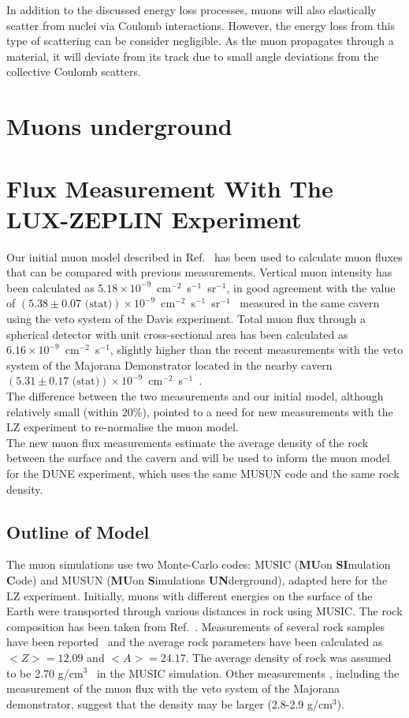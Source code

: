 In addition to the discussed energy loss processes, muons will also elastically scatter from nuclei via Coulomb interactions. However, the energy loss from this type of scattering can be consider negligible. As the muon propagates through a material, it will deviate from its track due to small angle deviations from the collective Coulomb scatters. 

\section{Muons underground}


\section{Flux Measurement With The LUX-ZEPLIN Experiment}
Our initial muon model described in Ref.~\cite{LZ_SIMS} has been used to calculate muon fluxes that can be compared with previous measurements. Vertical muon intensity has been calculated as $5.18\times10^{-9}$~cm$^{-2}$~s$^{-1}$~sr$^{-1}$, in good agreement with the value of $(5.38\pm0.07\text{ (stat)})\times10^{-9}$~cm$^{-2}$~s$^{-1}$~sr$^{-1}$~\cite{Cherry} measured in the same cavern using the veto system of the Davis experiment. Total muon flux through a spherical detector with unit cross-sectional area has been calculated as $6.16\times10^{-9}$~cm$^{-2}$~s$^{-1}$, slightly higher than the recent measurements with the veto system of the Majorana Demonstrator located in the nearby cavern $(5.31\pm0.17 \text{ (stat)})\times10^{-9}$~cm$^{-2}$~s$^{-1}$~\cite{majorana}.\\
The difference between the two measurements and our initial model, although relatively small (within 20\%), pointed to a need for new measurements with the LZ experiment to re-normalise the muon model.\\
The new muon flux measurements estimate the average density of the rock between the surface and the cavern and will be used to inform the muon model for the DUNE experiment\cite{DUNE}, which uses the same MUSUN code and the same rock density.

\subsection{Outline of Model}
The muon simulations use two Monte-Carlo codes: MUSIC (\textbf{MU}on \textbf{SI}mulation \textbf{C}ode) and MUSUN (\textbf{MU}on \textbf{S}imulations \textbf{UN}derground)\cite{music,musun}, adapted here for the LZ experiment. Initially, muons with different energies on the surface of the Earth were transported through various distances in rock using MUSIC. The rock composition has been taken from Ref.~\cite{mei,zhang}. Measurements of several rock samples have been reported~\cite{mei,zhang} and the average rock parameters have been calculated as $<Z>=12.09$ and $<A>=24.17$. The average density of rock was assumed to be 2.70 g/cm$^3$~\cite{zhang} in the MUSIC simulation. Other measurements \cite{heise}, including the measurement of the muon flux with the veto system of the Majorana demonstrator, suggest that the density may be larger (2.8-2.9 g/cm$^3$\cite{majorana}).

